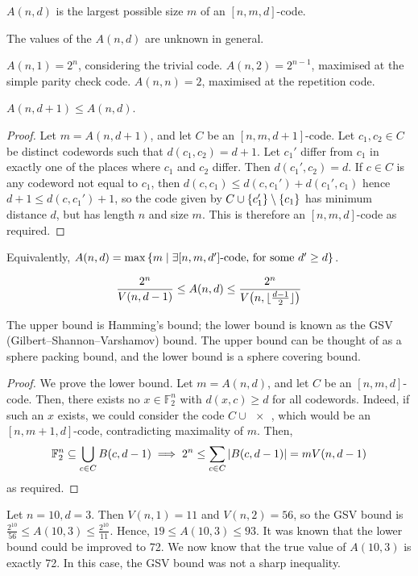 \begin{definition}
    \( A(n,d) \) is the largest possible size \( m \) of an \( [n,m,d] \)-code.
\end{definition}
The values of the \( A(n,d) \) are unknown in general.
\begin{example}
    \( A(n,1) = 2^n \), considering the trivial code.
    \( A(n,2) = 2^{n-1} \), maximised at the simple parity check code.
    \( A(n,n) = 2 \), maximised at the repetition code.
\end{example}
\begin{lemma}
    \( A(n,d+1) \leq A(n,d) \).
\end{lemma}
\begin{proof}
    Let \( m = A(n,d+1) \), and let \( C \) be an \( [n,m,d+1] \)-code.
    Let \( c_1, c_2 \in C \) be distinct codewords such that \( d(c_1,c_2) = d+1 \).
    Let \( c_1' \) differ from \( c_1 \) in exactly one of the places where \( c_1 \) and \( c_2 \) differ.
    Then \( d(c_1', c_2) = d \).
    If \( c \in C \) is any codeword not equal to \( c_1 \), then \( d(c,c_1) \leq d(c,c_1') + d(c_1',c_1) \) hence \( d + 1 \leq d(c,c_1') + 1 \), so the code given by \( C \cup \qty{c_1'} \setminus \qty{c_1} \) has minimum distance \( d \), but has length \( n \) and size \( m \).
    This is therefore an \( [n,m,d] \)-code as required.
\end{proof}
\begin{corollary}
    Equivalently, \( A(n,d) = \max \qty{m \mid \exists [n,m,d'] \text{-code, for some } d' \geq d} \).
\end{corollary}
\begin{theorem}
    \[ \frac{2^n}{V(n,d-1)} \leq A(n,d) \leq \frac{2^n}{V\qty(n,\lfloor\frac{d-1}{2}\rfloor)} \]
\end{theorem}
The upper bound is Hamming's bound; the lower bound is known as the GSV (Gilbert--Shannon--Varshamov) bound.
The upper bound can be thought of as a sphere packing bound, and the lower bound is a sphere covering bound.
\begin{proof}
    We prove the lower bound.
    Let \( m = A(n,d) \), and let \( C \) be an \( [n,m,d] \)-code.
    Then, there exists no \( x \in \mathbb F_2^n \) with \( d(x,c) \geq d \) for all codewords.
    Indeed, if such an \( x \) exists, we could consider the code \( C \cup \qty{x} \), which would be an \( [n,m+1,d] \)-code, contradicting maximality of \( m \).
    Then,
    \[ \mathbb F_2^n \subseteq \bigcup_{c \in C} B(c,d-1) \implies 2^n \leq \sum_{c \in C} \abs{B(c,d-1)} = mV(n,d-1) \]
    as required.
\end{proof}
\begin{example}
    Let \( n = 10, d = 3 \).
    Then \( V(n,1) = 11 \) and \( V(n,2) = 56 \), so the GSV bound is \( \frac{2^{10}}{56} \leq A(10,3) \leq \frac{2^{10}}{11} \).
    Hence, \( 19 \leq A(10,3) \leq 93 \).
    It was known that the lower bound could be improved to 72.
    We now know that the true value of \( A(10,3) \) is exactly 72.
    In this case, the GSV bound was not a sharp inequality.
\end{example}

